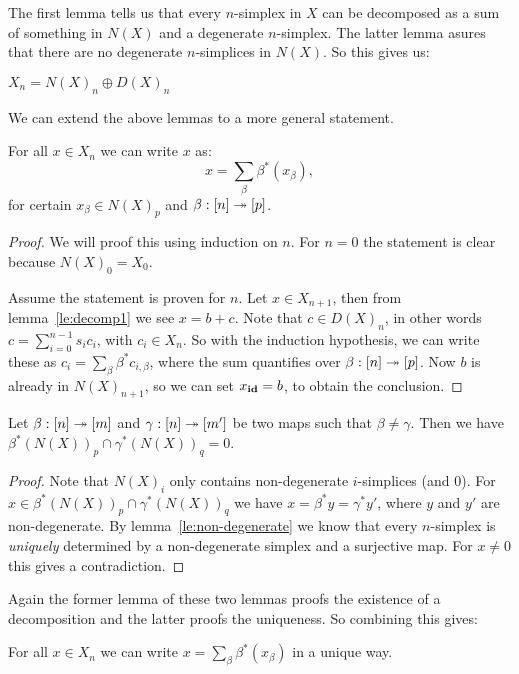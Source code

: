 The first lemma tells us that every $n$-simplex in $X$ can be decomposed as a sum of something in $N(X)$ and a degenerate $n$-simplex. The latter lemma asures that there are no degenerate $n$-simplices in $N(X)$. So this gives us:

\begin{corollary}
	\label{cor:NandD}
	$X_n = N(X)_n \oplus D(X)_n$
\end{corollary}

We can extend the above lemmas to a more general statement.

\begin{lemma}
	\label{le:decomp3}
	For all $x \in X_n$ we can write $x$ as:
	$$ x = \sum_\beta \beta^\ast (x_\beta), $$
	for certain $x_\beta \in N(X)_p$ and $\beta : [n] \twoheadrightarrow [p]$.
\end{lemma}
\begin{proof}
	We will proof this using induction on $n$. For $n=0$ the statement is clear because $N(X)_0 = X_0$.

	Assume the statement is proven for $n$. Let $x \in X_{n+1}$, then from lemma~\ref{le:decomp1} we see $x = b + c$. Note that $c \in D(X)_n$, in other words $c = \sum_{i=0}^{n-1} s_i c_i$, with $c_i \in X_n$. So with the induction hypothesis, we can write these as $c_i = \sum_\beta \beta^\ast c_{i, \beta}$, where the sum quantifies over $\beta: [n] \twoheadrightarrow [p]$. Now $b$ is already in $N(X)_{n+1}$, so we can set $x_{\mathbf{id}} = b$, to obtain the conclusion.
\end{proof}
\begin{lemma}
	\label{le:decomp4}
	Let $\beta : [n] \twoheadrightarrow [m]$ and $\gamma : [n] \twoheadrightarrow [m']$ be two maps such that $\beta \neq \gamma$. Then we have $\beta^\ast(N(X))_p \cap \gamma^\ast(N(X))_q = 0$.
\end{lemma}
\begin{proof}
	Note that $N(X)_i$ only contains non-degenerate $i$-simplices (and $0$). For $x \in \beta^\ast(N(X))_p \cap \gamma^\ast(N(X))_q$ we have $x = \beta^\ast y = \gamma^\ast y'$, where $y$ and $y'$ are non-degenerate. By lemma~\ref{le:non-degenerate} we know that every $n$-simplex is \emph{uniquely} determined by a non-degenerate simplex and a surjective map. For $x \neq 0$ this gives a contradiction.
\end{proof}

Again the former lemma of these two lemmas proofs the existence of a decomposition and the latter proofs the uniqueness. So combining this gives:

\begin{corollary}
	\label{cor:decomp}
	For all $x \in X_n$ we can write $x = \sum_\beta \beta^\ast (x_\beta)$ in a unique way.
\end{corollary}

